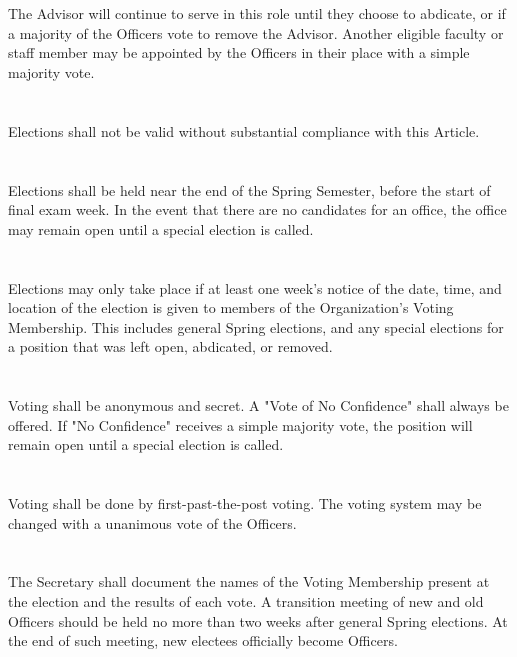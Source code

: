 \documentclass[12pt]{cls/constitution}
\begin{document}
\section{}
The Advisor will continue to serve in this role until they choose to abdicate, or if a majority of the Officers vote to remove the Advisor. Another eligible faculty or staff member may be appointed by the Officers in their place with a simple majority vote.


\section{}
Elections shall not be valid without substantial compliance with this Article. 

\section{}
Elections shall be held near the end of the Spring Semester, before the start of final exam week. In the event that there are no candidates for an office, the office may remain open until a special election is called. 

\section{}
Elections may only take place if at least one week’s notice of the date, time, and location of the election is given to members of the Organization's Voting Membership. This includes general Spring elections, and any special elections for a position that was left open, abdicated, or removed.

\section{}
Voting shall be anonymous and secret. A "Vote of No Confidence" shall always be offered. If "No Confidence" receives a simple majority vote, the position will remain open until a special election is called.

\section{}
Voting shall be done by first-past-the-post voting. The voting system may be changed with a unanimous vote of the Officers.

\section{}
The Secretary shall document the names of the Voting Membership present at the election and the results of each vote. A transition meeting of new and old Officers should be held no more than two weeks after general Spring elections. At the end of such meeting, new electees officially become Officers.
\end{document}
